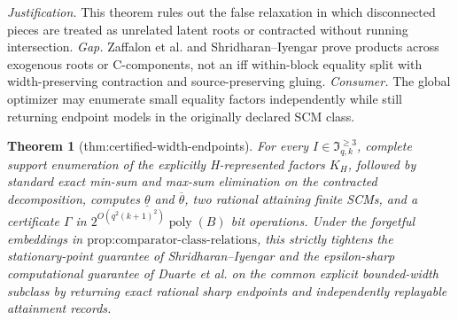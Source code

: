 \documentclass{article}
\newtheorem{theorem}{Theorem}
\begin{document}
\par\smallskip\noindent \textit{Justification.} This theorem rules out the false relaxation in which disconnected pieces are treated as unrelated latent roots or contracted without running intersection. \textit{Gap.} Zaffalon et al. and Shridharan--Iyengar prove products across exogenous roots or C-components, not an iff within-block equality split with width-preserving contraction and source-preserving gluing. \textit{Consumer.} The global optimizer may enumerate small equality factors independently while still returning endpoint models in the originally declared SCM class.

\begin{theorem}[thm:certified-width-endpoints]\label{thm:certified-width-endpoints}
For every \(I\in\mathfrak I_{q,k}^{\ge3}\), complete support enumeration of the explicitly H-represented factors \(K_H\), followed by standard exact min-sum and max-sum elimination on the contracted decomposition, computes \(\underline\theta\) and \(\overline\theta\), two rational attaining finite SCMs, and a certificate \(\Gamma\) in \(2^{O(q^2(k+1)^2)}\operatorname{poly}(B)\) bit operations. Under the forgetful embeddings in \(\text{prop:comparator-class-relations}\), this strictly tightens the stationary-point guarantee of Shridharan--Iyengar and the epsilon-sharp computational guarantee of Duarte et al. on the common explicit bounded-width subclass by returning exact rational sharp endpoints and independently replayable attainment records.
\end{theorem}
\end{document}
